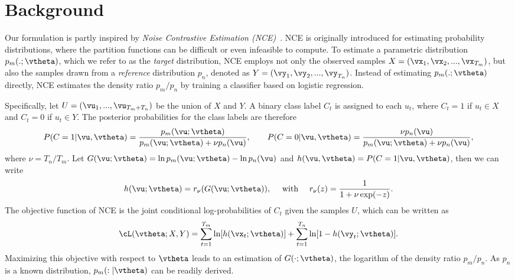 
\section{Background}
\label{sec:bg}

Our formulation is partly inspired by
\emph{Noise Contrastive Estimation (NCE)}~\cite{gutmann2012noise}.
NCE is originally introduced for estimating probability distributions,
where the partition functions can be difficult or even infeasible to compute.
To estimate a parametric distribution $p_m(.;\vtheta)$,
which we refer to as the \emph{target} distribution,
NCE employs not only the observed samples $X = (\vx_1, \vx_2, ..., \vx_{T_m})$,
but also the samples drawn from a \emph{reference} distribution $p_n$,
denoted as $Y = (\vy_1, \vy_2, ..., \vy_{T_n})$.
Instead of estimating $p_m(.;\vtheta)$ directly,
NCE estimates the density ratio $p_m / p_n$
by training a classifier based on logistic regression.

Specifically, let $U = (\vu_1, ..., \vu_{T_m + T_n})$ be the union of $X$ and $Y$.
A binary class label $C_t$ is assigned to each $u_t$,
where $C_t = 1$ if $u_t \in X$ and $C_t = 0$ if $u_t \in Y$.
The posterior probabilities for the class labels are therefore
\begin{align}
	P(C = 1|\vu,\vtheta) = \frac{p_m(\vu;\vtheta)}{p_m(\vu;\vtheta) + \nu p_n(\vu)},  \qquad P(C = 0|\vu,\vtheta) = \frac{\nu p_n(\vu)}{p_m(\vu;\vtheta) + \nu p_n(\vu)},
\end{align}
where $\nu = T_n / T_m$.
Let $G(\vu;\vtheta) = \ln p_m(\vu;\vtheta) - \ln p_n(\vu)$ and
$h(\vu,\vtheta) = P(C = 1|\vu,\vtheta)$, then we can write
\begin{equation}
	h(\vu;\vtheta) = r_\nu(G(\vu;\vtheta)), \quad
	\text{ with } \quad
	r_\nu(z) = \frac{1}{1 + \nu\exp(-z)}. \label{eq:logistic}
\end{equation}
%
The objective function of NCE is the joint conditional log-probabilities
of $C_t$ given the samples $U$, which can be written as
\begin{equation}
	\cL(\vtheta;X,Y)
	=
	\sum^{T_m}_{t = 1} \ln[h(\vx_t;\vtheta)] + \sum^{T_n}_{t = 1} \ln[1 - h(\vy_t;\vtheta)].
\end{equation}
%
Maximizing this objective with respect to $\vtheta$ leads to an estimation
of $G(\cdot;\vtheta)$, the logarithm of the density ratio $p_m / p_n$.
As $p_n$ is a known distribution, $p_m(:|\vtheta)$ can be readily derived.

